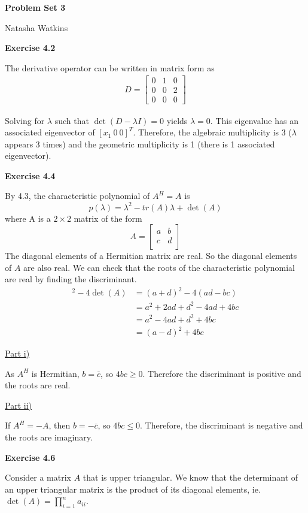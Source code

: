 \documentclass[letterpaper,12pt]{article}
\begin{document}
\textbf{\large Problem Set 3}

Natasha Watkins

\vspace{5mm}

\textbf{Exercise 4.2}

The derivative operator can be written in matrix form as
\begin{align*}
D =
\begin{bmatrix}
0 & 1 & 0 \\
0 & 0 & 2 \\
0 & 0 & 0
\end{bmatrix}
\end{align*}

Solving for $\lambda$ such that $\det(D - \lambda I) = 0$ yields $\lambda = 0$. This eigenvalue has an associated eigenvector of $[x_1 \ 0 \ 0]^T$. Therefore, the algebraic multiplicity is 3 ($\lambda$ appears 3 times) and the geometric multiplicity is 1 (there is 1 associated eigenvector).

\textbf{Exercise 4.4}

By 4.3, the characteristic polynomial of $A^H = A$ is
$$
p(\lambda) = \lambda^2 - tr(A) \lambda + \det(A)
$$
where A is a $2 \times 2$ matrix of the form
$$
A =
\begin{bmatrix}
a & b \\
c & d \\
\end{bmatrix}
$$
The diagonal elements of a Hermitian matrix are real. So the diagonal elements of $A$ are also real. We can check that the roots of the characteristic polynomial are real by finding the discriminant.
\begin{align*}
[tr(A)]^2 - 4 \det(A) &= (a + d)^2 - 4 (ad - bc) \\
&= a^2 + 2ad + d^2 -4ad + 4bc \\
&= a^2 - 4ad + d^2 + 4bc \\
&= (a - d)^2 + 4bc
\end{align*}

\underline{Part i)}

As $A^H$ is Hermitian, $b = \bar{c}$, so $4bc \geq 0$. Therefore the discriminant is positive and the roots are real.

\underline{Part ii)}

If $A^H = -A$, then $b = -\bar{c}$, so $4bc \leq 0$. Therefore, the discriminant is negative and the roots are imaginary.

\textbf{Exercise 4.6}

Consider a matrix $A$ that is upper triangular. We know that the determinant of an upper triangular matrix is the product of its diagonal elements, ie. $\det(A) = \prod_{i=1}^n a_{ii}$.
\end{document}
